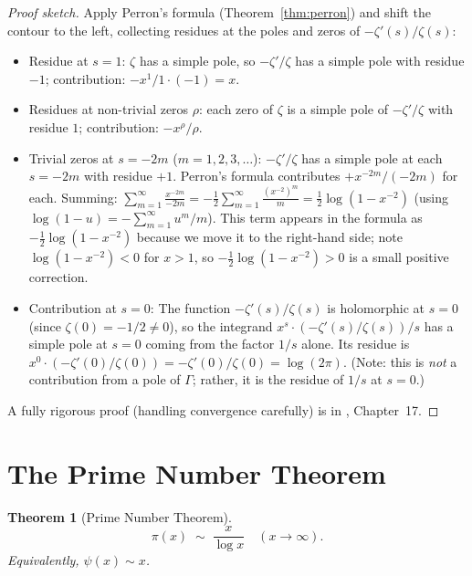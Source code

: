 \documentclass[12pt,a4paper]{amsart}
\newtheorem{theorem}{Theorem}[section]
\theoremstyle{definition}
\begin{document}
\begin{proof}[Proof sketch]
Apply Perron's formula (Theorem~\ref{thm:perron}) and shift the contour
to the left, collecting residues at the poles and zeros of
$-\zeta'(s)/\zeta(s)$:
\begin{itemize}
  \item Residue at $s = 1$: $\zeta$ has a simple pole, so $-\zeta'/\zeta$
    has a simple pole with residue $-1$; contribution: $-x^1/1 \cdot (-1) = x$.
  \item Residues at non-trivial zeros $\rho$: each zero of $\zeta$ is a
    simple pole of $-\zeta'/\zeta$ with residue $1$; contribution: $-x^\rho/\rho$.
  \item Trivial zeros at $s = -2m$ ($m=1,2,3,\ldots$):
    $-\zeta'/\zeta$ has a simple pole at each $s = -2m$ with residue $+1$.
    Perron's formula contributes $+x^{-2m}/(-2m)$ for each.
    Summing:
    $\displaystyle\sum_{m=1}^\infty \frac{x^{-2m}}{-2m}
     = -\tfrac{1}{2}\sum_{m=1}^\infty \frac{(x^{-2})^m}{m}
     = \tfrac{1}{2}\log(1-x^{-2})$
    (using $\log(1-u)=-\sum_{m=1}^\infty u^m/m$).
    This term appears in the formula as $-\tfrac{1}{2}\log(1-x^{-2})$
    because we move it to the right-hand side; note $\log(1-x^{-2}) < 0$
    for $x > 1$, so $-\tfrac{1}{2}\log(1-x^{-2}) > 0$ is a small positive correction.
  \item Contribution at $s = 0$: The function $-\zeta'(s)/\zeta(s)$ is
    holomorphic at $s=0$ (since $\zeta(0) = -1/2 \ne 0$), so the integrand
    $x^s \cdot (-\zeta'(s)/\zeta(s)) / s$ has a simple pole at $s=0$ coming
    from the factor $1/s$ alone. Its residue is $x^0 \cdot (-\zeta'(0)/\zeta(0))
    = -\zeta'(0)/\zeta(0) = \log(2\pi)$.
    (Note: this is \emph{not} a contribution from a pole of $\Gamma$; rather,
    it is the residue of $1/s$ at $s=0$.)
\end{itemize}
A fully rigorous proof (handling convergence carefully) is in
\cite{Davenport2000}, Chapter~17.
\end{proof}

\section{The Prime Number Theorem}

\begin{theorem}[Prime Number Theorem]
\label{thm:pnt}
\[
  \pi(x) \;\sim\; \frac{x}{\log x} \quad (x \to \infty).
\]
Equivalently, $\psi(x) \sim x$.
\end{theorem}
\end{document}
